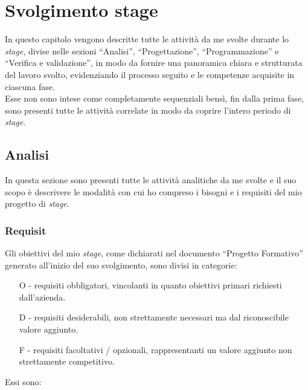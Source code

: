 \chapter{Svolgimento stage}
\label{cap:svolgimentoStage}
In questo capitolo vengono descritte tutte le attività da me svolte durante lo \emph{stage}, divise nelle sezioni “Analisi”, “Progettazione”, “Programmazione” e “Verifica e validazione”, in modo da fornire una panoramica chiara e strutturata del lavoro svolto, evidenziando il processo seguito e le competenze acquisite in ciascuna fase.\\
Esse non sono intese come completamente sequenziali bensì, fin dalla prima fase, sono presenti tutte le attività correlate in modo da coprire l'intero periodo di \emph{stage}.\\
\section{Analisi}
In questa sezione sono presenti tutte le attività analitiche da me svolte e il suo scopo è descrivere le modalità con cui ho compreso i bisogni e i requisiti del mio progetto di \emph{stage}. 

\subsection*{Requisit}
Gli obiettivi del mio \emph{stage}, come dichiarati nel documento “Progetto Formativo” generato all'inizio del suo svolgimento, sono divisi in categorie:
\begin{enumerate}
	\item[O -]requisiti obbligatori, vincolanti in quanto obiettivi primari richiesti dall'azienda.
    \item[D -]requisiti desiderabili, non strettamente necessari ma dal riconoscibile valore aggiunto.
    \item[F -]requisiti facoltativi / opzionali, rappresentanti un valore aggiunto non strettamente competitivo.\\
\end{enumerate}
Essi sono:

